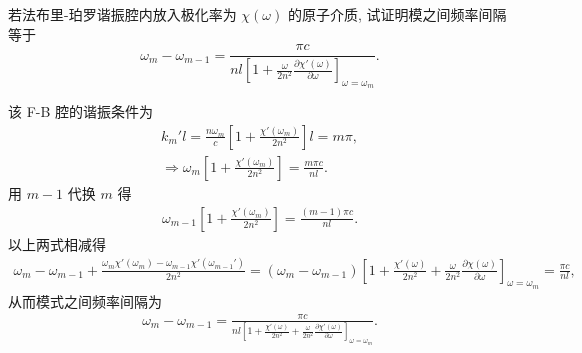 \documentclass{note}
\begin{document}
\begin{exe}
    若法布里-珀罗谐振腔内放入极化率为 $\chi(\omega)$ 的原子介质, 试证明模之间频率间隔等于
    \[
        \omega_m-\omega_{m-1}=\frac{\pi c}{nl\left[1+\frac{\omega}{2n^2}\frac{\partial\chi'(\omega)}{\partial\omega}\right]_{\omega=\omega_m}}.
    \]
\end{exe}
\begin{pf}
    该 F-B 腔的谐振条件为
    \begin{gather}
        k_m'l=\frac{n\omega_m}{c}\left[1+\frac{\chi'(\omega_m)}{2n^2}\right]l=m\pi,\\
        \Longrightarrow\omega_m\left[1+\frac{\chi'(\omega_m)}{2n^2}\right]=\frac{m\pi c}{nl}.
    \end{gather}
    用 $m-1$ 代换 $m$ 得
    \begin{align}
        \omega_{m-1}\left[1+\frac{\chi'(\omega_m)}{2n^2}\right]=\frac{(m-1)\pi c}{nl}.
    \end{align}
    以上两式相减得
    \begin{align}
        \omega_m-\omega_{m-1}+\frac{\omega_m\chi'(\omega_m)-\omega_{m-1}\chi'(\omega_{m-1}')}{2n^2}=(\omega_m-\omega_{m-1})\left[1+\frac{\chi'(\omega)}{2n^2}+\frac{\omega}{2n^2}\frac{\partial\chi(\omega)}{\partial\omega}\right]_{\omega=\omega_m}=\frac{\pi c}{nl},
    \end{align}
    从而模式之间频率间隔为
    \begin{align}
        \omega_m-\omega_{m-1}=\frac{\pi c}{nl\left[1+\frac{\chi'(\omega)}{2n^2}+\frac{\omega}{2n^2}\frac{\partial\chi'(\omega)}{\partial\omega}\right]_{\omega=\omega_m}}.
    \end{align}
\end{pf}
\end{document}
